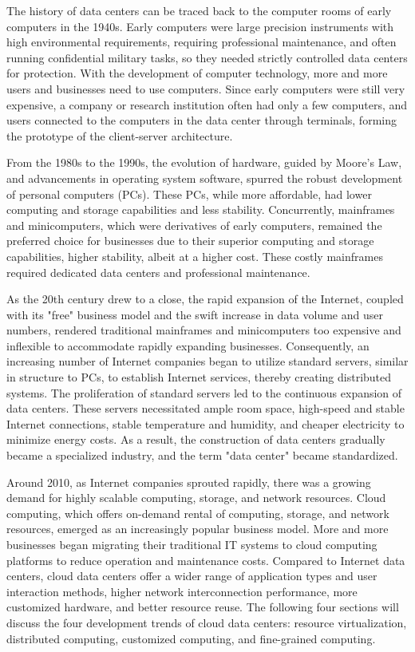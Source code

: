 The history of data centers can be traced back to the computer rooms of early computers in the 1940s. Early computers were large precision instruments with high environmental requirements, requiring professional maintenance, and often running confidential military tasks, so they needed strictly controlled data centers for protection. With the development of computer technology, more and more users and businesses need to use computers. Since early computers were still very expensive, a company or research institution often had only a few computers, and users connected to the computers in the data center through terminals, forming the prototype of the client-server architecture.

From the 1980s to the 1990s, the evolution of hardware, guided by Moore's Law, and advancements in operating system software, spurred the robust development of personal computers (PCs). These PCs, while more affordable, had lower computing and storage capabilities and less stability. Concurrently, mainframes and minicomputers, which were derivatives of early computers, remained the preferred choice for businesses due to their superior computing and storage capabilities, higher stability, albeit at a higher cost. These costly mainframes required dedicated data centers and professional maintenance.

As the 20th century drew to a close, the rapid expansion of the Internet, coupled with its "free" business model and the swift increase in data volume and user numbers, rendered traditional mainframes and minicomputers too expensive and inflexible to accommodate rapidly expanding businesses. Consequently, an increasing number of Internet companies began to utilize standard servers, similar in structure to PCs, to establish Internet services, thereby creating distributed systems. The proliferation of standard servers led to the continuous expansion of data centers. These servers necessitated ample room space, high-speed and stable Internet connections, stable temperature and humidity, and cheaper electricity to minimize energy costs. As a result, the construction of data centers gradually became a specialized industry, and the term "data center" became standardized.

Around 2010, as Internet companies sprouted rapidly, there was a growing demand for highly scalable computing, storage, and network resources. Cloud computing, which offers on-demand rental of computing, storage, and network resources, emerged as an increasingly popular business model. More and more businesses began migrating their traditional IT systems to cloud computing platforms to reduce operation and maintenance costs. Compared to Internet data centers, cloud data centers offer a wider range of application types and user interaction methods, higher network interconnection performance, more customized hardware, and better resource reuse. The following four sections will discuss the four development trends of cloud data centers: resource virtualization, distributed computing, customized computing, and fine-grained computing.

